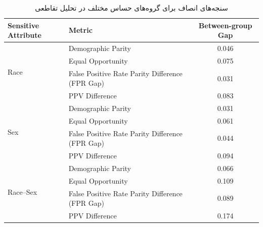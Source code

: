 \begin{table}[H]
	\centering
	\caption{سنجه‌های انصاف برای گروه‌های حساس مختلف در تحلیل تقاطعی}
	\label{tab:intersectional_fairness}
	
	\begin{latin}
		\begin{tabular}{|l|l|c|}
			\hline
			\textbf{Sensitive Attribute} & \textbf{Metric} & \textbf{Between-group Gap} \\
			\hline
			
			\multirow{4}{*}{Race}
			& Demographic Parity & 0.046 \\
			& Equal Opportunity & 0.075 \\
			& False Positive Rate Parity Difference (FPR Gap) & 0.031 \\
			& PPV Difference & 0.083 \\
			\hline
			
			\multirow{4}{*}{Sex}
			& Demographic Parity & 0.031 \\
			& Equal Opportunity & 0.061 \\
			& False Positive Rate Parity Difference (FPR Gap) & 0.044 \\
			& PPV Difference & 0.094 \\
			\hline
			
			\multirow{4}{*}{Race--Sex}
			& Demographic Parity & 0.066 \\
			& Equal Opportunity & 0.109 \\
			& False Positive Rate Parity Difference (FPR Gap) & 0.089 \\
			& PPV Difference & 0.174 \\
			\hline
		\end{tabular}
	\end{latin}
	
\end{table}




